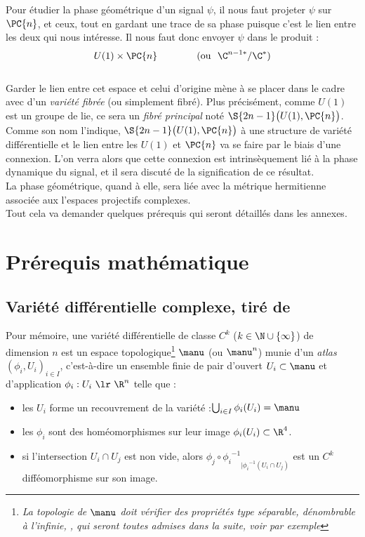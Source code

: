 Pour étudier la phase géométrique d'un signal $\psi$, il nous faut projeter $\psi$ sur $\PC{n}$, et ceux, tout en gardant une trace de sa phase puisque c'est le lien entre les deux qui nous intéresse. Il nous faut donc envoyer $\psi$ dans le produit :
\[U(1)\times \PC{n}\qquad\qquad (\text{ou }\ \C^{n-1*}/\C^*)\]
\\
Garder le lien entre cet espace et celui d'origine mène à se placer dans le cadre avec d'un \emph{variété fibrée} (ou simplement fibré). Plus précisément, comme $U(1)$ est un groupe de lie, ce sera un \emph{fibré principal} noté $\S{2n-1}\big(U(1),\PC{n}\big)$.
\\

Comme son nom l'indique, $\S{2n-1}\big(U(1),\PC{n}\big)$ à une structure de variété différentielle et le lien entre les $U(1)$ et $\PC{n}$ va se faire par le biais d'une connexion. L'on verra alors que cette connexion est intrinsèquement lié à la phase dynamique du signal, et il sera discuté de la signification de ce résultat.
\\
La phase géométrique, quand à elle, sera liée avec la métrique hermitienne associée aux l'espaces projectifs complexes.
\\
Tout cela va demander quelques prérequis qui seront détaillés dans les annexes. 



\section{Prérequis mathématique}

\subsection{Variété différentielle complexe, tiré de \cite{nakahara_geometry_2003}}



Pour mémoire, une variété différentielle de classe $C^k$ ($k\in\N\cup\{\infty\}$) de dimension $n$ est un espace topologique\footnote{\itshape
	La topologie de $\manu$ doit vérifier des propriétés type séparable, dénombrable à l'infinie, \etc, qui seront toutes admises dans la suite, voir par exemple }
$\manu$ (ou $\manu^n$) munie d'un \emph{atlas} $(\phi_i, U_i)_{i\in I}$, c'est-à-dire un ensemble finie de pair d'ouvert $U_i\subset \manu$ et d'application $\phi_i :U_i\ \lr\ \R^n$ telle que :
\begin{itemize}
	
	\item les $U_i$ forme un recouvrement de la variété :\qquad $\bigcup_{i\in I} \phi_i(U_i) = \manu$
	
	\item les $\phi_i$ sont des homéomorphismes sur leur image $\phi_i(U_i)\subset\R^4$.
	
	\item si l'intersection $U_i \cap U_j$ est non vide, alors ${\phi_j \circ {\phi_i}^{-1}}_{| {\phi_i}^{-1}(U_i\cap U_j)}$ est un $C^k$ difféomorphisme sur son image.
\end{itemize}

